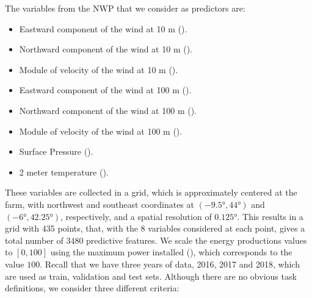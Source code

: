 The variables from the NWP that we consider as predictors are:
\begin{itemize}
    \item	Eastward component of the wind at {10 m} %
     ().
    \item	Northward  component of the wind at {10 m} ().
    \item   Module of velocity of the wind at 10 m ().
    \item	Eastward  component of the wind at {100 m} ().
    \item	Northward component of the wind at {100 m} ().
    \item   Module of velocity of the wind at 100 m ().
    \item   Surface {Pressure} ().
    \item	2 meter {temperature} ().
\end{itemize}
These variables are collected in a grid, which is approximately centered at the farm, with northwest and southeast coordinates at $(\ang{-9.5}, \ang{44})$ and $(\ang{-6}, \ang{42.25})$, respectively, and a spatial resolution of $\ang{0.125}$.
This results in a grid with $435$ points, that, with the $8$ variables considered at each point, gives a total number of {3480} predictive features.
We scale the energy productions values to $[0, 100]$ using the maximum power installed (), which corresponds to the value $100$.
%
Recall that we have three years of data, 2016, 2017 and 2018, which are used as train, validation and test sets.
%
Although there are no obvious task definitions, we consider three different criteria:
